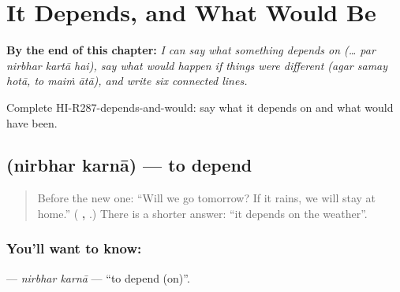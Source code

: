 
\chapter{It Depends, and What Would Be}
\label{ch:hi-it-depends-and-what-would-be}

\begin{chapteropening}
\textbf{By the end of this chapter:} \emph{I can say what something depends on (… par nirbhar kartā hai), say what would happen if things were different (agar samay hotā, to maiṁ ātā), and write six connected lines.}

Complete HI-R287-depends-and-would: say what it depends on and what would have been.
\end{chapteropening}

\section[\texorpdfstring{\hi{निर्भर} \hi{करना} (nirbhar karnā)}{निर्भर करना (nirbhar karnā)}]{  (nirbhar karnā) — to depend}

\label{lesson:HI-C287-nirbharkarna}



\begin{quote}
Before the new one: \textquotedblleft{}Will we go tomorrow? If it rains, we will stay at home.\textquotedblright{} (\textbf{  ,     }.) There is a shorter answer: \textquotedblleft{}it depends on the weather\textquotedblright{}.
\end{quote}

\subsection*{You'll want to know:  }
\textbf{ } — \emph{nirbhar karnā} — \textquotedblleft{}to depend (on)\textquotedblright{}.

\begin{quote}
\textbf{     }
\end{quote}

